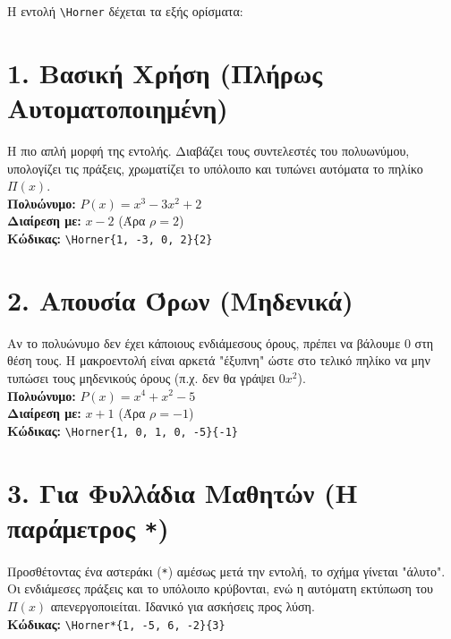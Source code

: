 \documentclass{article}
\begin{document}
Η εντολή \texttt{\textbackslash Horner} δέχεται τα εξής ορίσματα: \\

\vspace{1cm}

\section*{1. Βασική Χρήση (Πλήρως Αυτοματοποιημένη)}
Η πιο απλή μορφή της εντολής. Διαβάζει τους συντελεστές του πολυωνύμου, υπολογίζει τις πράξεις, χρωματίζει το υπόλοιπο και τυπώνει αυτόματα το πηλίκο $\Pi(x)$. \\
\textbf{Πολυώνυμο:} $P(x) = x^3 - 3x^2 + 2$ \\
\textbf{Διαίρεση με:} $x - 2$ (Άρα $\rho = 2$) \\
\textbf{Κώδικας:} \verb|\Horner{1, -3, 0, 2}{2}| \\

\vspace{0.5cm}

\section*{2. Απουσία Όρων (Μηδενικά)}
Αν το πολυώνυμο δεν έχει κάποιους ενδιάμεσους όρους, πρέπει να βάλουμε $0$ στη θέση τους. Η μακροεντολή είναι αρκετά "έξυπνη" ώστε στο τελικό πηλίκο να μην τυπώσει τους μηδενικούς όρους (π.χ. δεν θα γράψει $0x^2$). \\
\textbf{Πολυώνυμο:} $P(x) = x^4 + x^2 - 5$ \\
\textbf{Διαίρεση με:} $x + 1$ (Άρα $\rho = -1$) \\
\textbf{Κώδικας:} \verb|\Horner{1, 0, 1, 0, -5}{-1}| \\

\vspace{0.5cm}

\section*{3. Για Φυλλάδια Μαθητών (Η παράμετρος \texttt{*})}
Προσθέτοντας ένα αστεράκι (\texttt{*}) αμέσως μετά την εντολή, το σχήμα γίνεται "άλυτο". Οι ενδιάμεσες πράξεις και το υπόλοιπο κρύβονται, ενώ η αυτόματη εκτύπωση του $\Pi(x)$ απενεργοποιείται. Ιδανικό για ασκήσεις προς λύση. \\
\textbf{Κώδικας:} \verb|\Horner*{1, -5, 6, -2}{3}| \\
\end{document}
